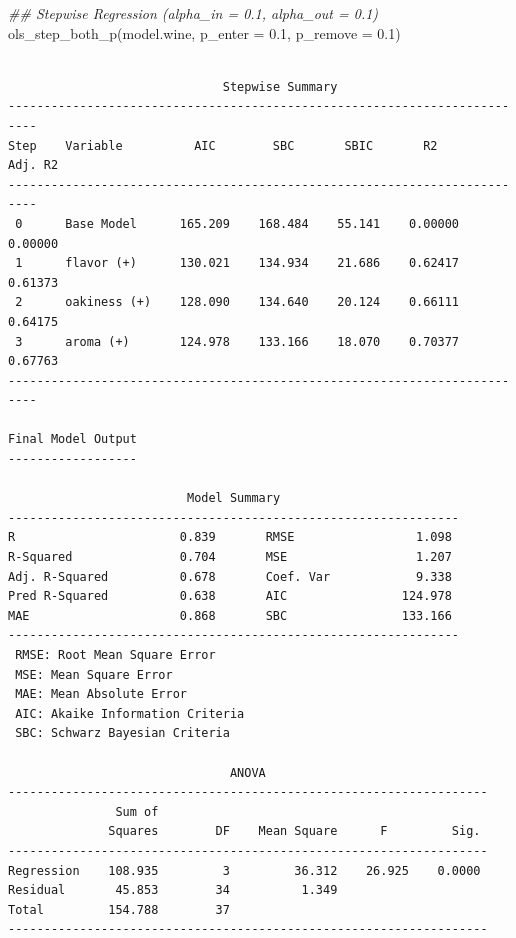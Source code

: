 \documentclass[
  letterpaper,
]{scrbook}
\newenvironment{Shaded}{\begin{snugshade}}{\end{snugshade}}
\newcommand{\AttributeTok}[1]{\textcolor[rgb]{0.40,0.45,0.13}{#1}}
\newcommand{\DocumentationTok}[1]{\textcolor[rgb]{0.37,0.37,0.37}{\textit{#1}}}
\newcommand{\FloatTok}[1]{\textcolor[rgb]{0.68,0.00,0.00}{#1}}
\newcommand{\FunctionTok}[1]{\textcolor[rgb]{0.28,0.35,0.67}{#1}}
\newcommand{\NormalTok}[1]{\textcolor[rgb]{0.00,0.23,0.31}{#1}}
\begin{document}
\begin{Shaded}
\begin{Highlighting}[]
\DocumentationTok{\#\# Stepwise Regression (alpha\_in = 0.1, alpha\_out = 0.1)}
\FunctionTok{ols\_step\_both\_p}\NormalTok{(model.wine, }\AttributeTok{p\_enter =} \FloatTok{0.1}\NormalTok{, }\AttributeTok{p\_remove =} \FloatTok{0.1}\NormalTok{)}
\end{Highlighting}
\end{Shaded}

\begin{verbatim}

                              Stepwise Summary                              
--------------------------------------------------------------------------
Step    Variable          AIC        SBC       SBIC       R2       Adj. R2 
--------------------------------------------------------------------------
 0      Base Model      165.209    168.484    55.141    0.00000    0.00000 
 1      flavor (+)      130.021    134.934    21.686    0.62417    0.61373 
 2      oakiness (+)    128.090    134.640    20.124    0.66111    0.64175 
 3      aroma (+)       124.978    133.166    18.070    0.70377    0.67763 
--------------------------------------------------------------------------

Final Model Output 
------------------

                         Model Summary                          
---------------------------------------------------------------
R                       0.839       RMSE                 1.098 
R-Squared               0.704       MSE                  1.207 
Adj. R-Squared          0.678       Coef. Var            9.338 
Pred R-Squared          0.638       AIC                124.978 
MAE                     0.868       SBC                133.166 
---------------------------------------------------------------
 RMSE: Root Mean Square Error 
 MSE: Mean Square Error 
 MAE: Mean Absolute Error 
 AIC: Akaike Information Criteria 
 SBC: Schwarz Bayesian Criteria 

                               ANOVA                                
-------------------------------------------------------------------
               Sum of                                              
              Squares        DF    Mean Square      F         Sig. 
-------------------------------------------------------------------
Regression    108.935         3         36.312    26.925    0.0000 
Residual       45.853        34          1.349                     
Total         154.788        37                                    
-------------------------------------------------------------------


\end{verbatim}
\end{document}
